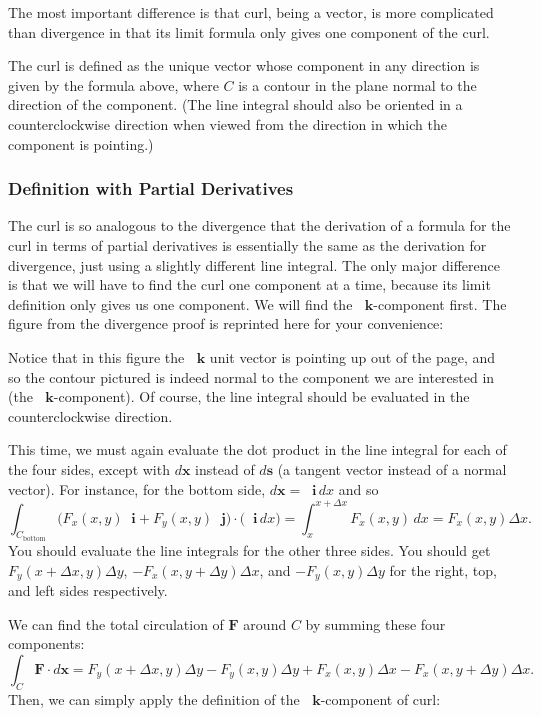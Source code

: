 \documentclass{myarticle}
\renewcommand{\vec}[1]{\mathbf{#1}}
\newcommand{\unitvector}[1]{
  \mathop{}\!\vec{#1}
}
\newcommand{\ih}{\unitvector{i}}
\newcommand{\jh}{\unitvector{j}}
\newcommand{\kh}{\unitvector{k}}
\theoremstyle{nospace}
\newtheorem{old series theorem}{Theorem}
\newenvironment{series theorem}
{\begin{mdframed}\begin{old series theorem}}
    {\end{old series theorem}\end{mdframed}}
\begin{document}
The most important difference is that curl, being a vector, is more
complicated than divergence in that its limit formula only gives one
component of the curl.

The curl is defined as the unique vector whose component in any
direction is given by the formula above, where $C$ is a contour in the
plane normal to the direction of the component. (The line integral
should also be oriented in a counterclockwise direction when viewed
from the direction in which the component is pointing.)

\subsubsection{Definition with Partial Derivatives}
\label{sec:curl definition with partial derivatives}

The curl is so analogous to the divergence that the derivation of a
formula for the curl in terms of partial derivatives is essentially
the same as the derivation for divergence, just using a slightly
different line integral. The only major difference is that we will
have to find the curl one component at a time, because its limit
definition only gives us one component. We will find the
$\kh$-component first. The figure from the divergence proof is
reprinted here for your convenience:

\begin{figure}[htb!] \centering
  \usebox{\divergencerectangle}
\end{figure}

Notice that in this figure the $\kh$ unit vector is pointing up out of
the page, and so the contour pictured is indeed normal to the
component we are interested in (the $\kh$-component). Of course, the
line integral should be evaluated in the counterclockwise direction.

This time, we must again evaluate the dot product in the line integral
for each of the four sides, except with $d\vec{x}$ instead of
$d\vec{s}$ (a tangent vector instead of a normal vector). For
instance, for the bottom side, $d\vec{x} = \ih \,dx$ and so
\[
  \int_{C_{\text{bottom}}}
  \big(F_x(x, y) \ih + F_y(x, y) \jh\big)
  \cdot \big(\ih \,dx\big)
  = \int_x^{x + \Delta x} F_x(x, y) \,dx
  = F_x(x, y)\Delta x.
\]
You should evaluate the line integrals for the other three sides. You
should get $F_y(x + \Delta x, y)\Delta y$,
$-F_x(x, y + \Delta y)\Delta x$, and $-F_y(x, y)\Delta y$ for the
right, top, and left sides respectively.

We can find the total circulation of $\vec{F}$ around $C$ by summing
these four components:
\[
  \int_C \vec{F} \cdot d\vec{x}
  = F_y(x + \Delta x, y)\Delta y
  - F_y(x, y)\Delta y
  + F_x(x, y)\Delta x
  - F_x(x, y + \Delta y)\Delta x.
\]
Then, we can simply apply the definition of the $\kh$-component of
curl:
\end{document}
